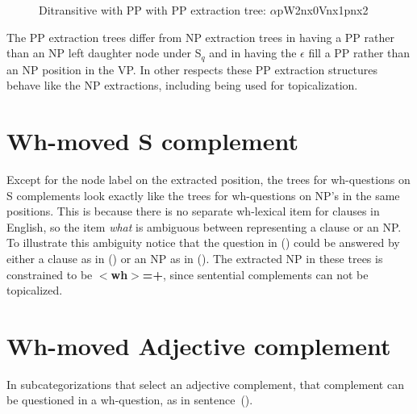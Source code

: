 \begin{figure}[htb]
\centering
\mbox{}
\caption{Ditransitive with PP with PP extraction tree: $\alpha$pW2nx0Vnx1pnx2}
\label{alphapW2nx0Vnx1pnx2} 
\label{2;9,4}
\end{figure}


The PP extraction trees differ from NP extraction trees in having a PP
rather than an NP left daughter node under S$_{q}$ and in having the
$\epsilon$ fill a PP rather than an NP position in the VP. In other
respects these PP extraction structures behave like the NP extractions,
including being used for topicalization.



\section{Wh-moved S complement}

Except for the node label on the extracted position, the trees for wh-questions
on S complements look exactly like the trees for wh-questions on NP's in the
same positions.  This is because there is no separate wh-lexical item for
clauses in English, so the item {\it what} is ambiguous between representing a
clause or an NP.  To illustrate this ambiguity notice that the question in
() could be answered by either a clause as in () or an NP as in
().  The extracted NP in these trees is constrained to be {\bf
$<$wh$>$=+}, since sentential complements can not be topicalized.





\section{Wh-moved Adjective complement}
In subcategorizations that select an adjective complement, that
complement can be questioned in a wh-question, as in sentence~().


